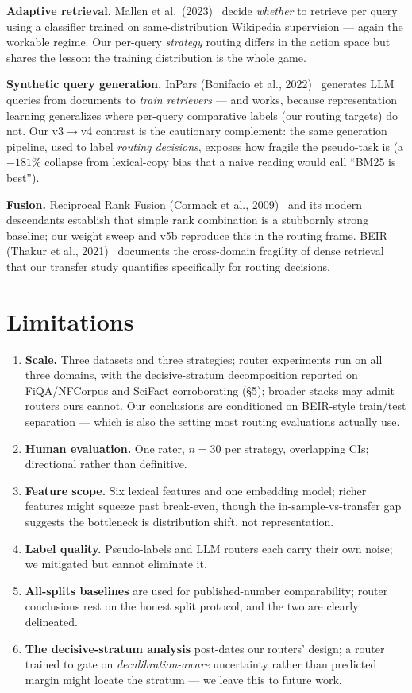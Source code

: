\documentclass[11pt]{article}
\begin{document}
\textbf{Adaptive retrieval.} Mallen et al.\ (2023)~\cite{mallen} decide \emph{whether} to retrieve per query using a classifier trained on same-distribution Wikipedia supervision --- again the workable regime. Our per-query \emph{strategy} routing differs in the action space but shares the lesson: the training distribution is the whole game.

\textbf{Synthetic query generation.} InPars (Bonifacio et al., 2022)~\cite{inpars} generates LLM queries from documents to \emph{train retrievers} --- and works, because representation learning generalizes where per-query comparative labels (our routing targets) do not. Our v3$\to$v4 contrast is the cautionary complement: the same generation pipeline, used to label \emph{routing decisions}, exposes how fragile the pseudo-task is (a $-181\%$ collapse from lexical-copy bias that a naive reading would call ``BM25 is best'').

\textbf{Fusion.} Reciprocal Rank Fusion (Cormack et al., 2009)~\cite{rrf} and its modern descendants establish that simple rank combination is a stubbornly strong baseline; our weight sweep and v5b reproduce this in the routing frame. BEIR (Thakur et al., 2021)~\cite{beir} documents the cross-domain fragility of dense retrieval that our transfer study quantifies specifically for routing decisions.

\section{Limitations}
\begin{enumerate}
\item \textbf{Scale.} Three datasets and three strategies; router experiments run on all three domains, with the decisive-stratum decomposition reported on FiQA/NFCorpus and SciFact corroborating (\S5); broader stacks may admit routers ours cannot. Our conclusions are conditioned on BEIR-style train/test separation --- which is also the setting most routing evaluations actually use.
\item \textbf{Human evaluation.} One rater, $n{=}30$ per strategy, overlapping CIs; directional rather than definitive.
\item \textbf{Feature scope.} Six lexical features and one embedding model; richer features might squeeze past break-even, though the in-sample-vs-transfer gap suggests the bottleneck is distribution shift, not representation.
\item \textbf{Label quality.} Pseudo-labels and LLM routers each carry their own noise; we mitigated but cannot eliminate it.
\item \textbf{All-splits baselines} are used for published-number comparability; router conclusions rest on the honest split protocol, and the two are clearly delineated.
\item \textbf{The decisive-stratum analysis} post-dates our routers' design; a router trained to gate on \emph{decalibration-aware} uncertainty rather than predicted margin might locate the stratum --- we leave this to future work.
\end{enumerate}
\end{document}
